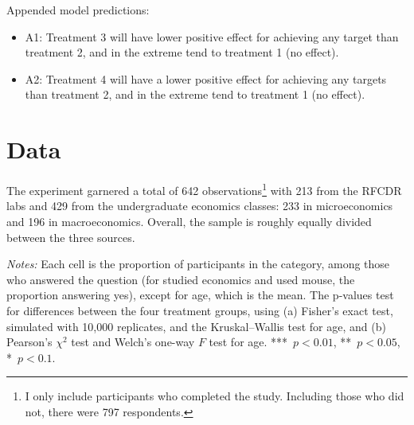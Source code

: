 \documentclass[12pt, letterpaper]{article}
\begin{document}
\noindent Appended model predictions:

\begin{itemize}
\item A1: Treatment 3 will have lower positive effect for achieving any target than treatment 2, and in the extreme tend to treatment 1 (no effect).
\item A2: Treatment 4 will have a lower positive effect for achieving any targets than treatment 2, and in the extreme tend to treatment 1 (no effect).
\end{itemize}

\section{Data}

The experiment garnered a total of 642 observations\footnote{I only include participants who completed the study. Including those who did not, there were 797 respondents.} with 213 from the RFCDR labs and 429 from the undergraduate economics classes: 233 in microeconomics and 196 in macroeconomics. Overall, the sample is roughly equally divided between the three sources.

\begin{table}
\centering
\begin{threeparttable}

\begin{tablenotes}[flushleft]
\footnotesize
\item \textit{Notes:} Each cell is the proportion of participants in the category, among those who answered the question (for studied economics and used mouse, the proportion answering yes), except for age, which is the mean. The p-values test for differences between the four treatment groups, using (a) Fisher's exact test, simulated with 10,000 replicates, and the Kruskal--Wallis test for age, and (b) Pearson's $\chi^2$ test and Welch's one-way $F$ test for age. ***~$p<0.01$, **~$p<0.05$, *~$p<0.1$.
\end{tablenotes}
\end{threeparttable}
\caption{Covariate balance for lab sample}\label{tab:covariates-sumstats-lab}
\end{table}
\end{document}
